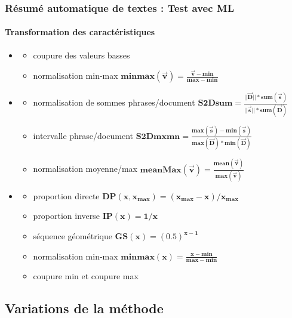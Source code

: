 \documentclass[xcolor=table]{beamer}
\begin{document}
\begin{frame}
\frametitle{Résumé automatique de textes : Test avec ML}
\framesubtitle{Transformation des caractéristiques}

\begin{itemize}
	\item {}
	\begin{itemize}
		\item coupure des valeurs basses
		\item normalisation min-max 
		{\color{red}
		$\mathbf{minmax(\overrightarrow{v}) = \frac{\overrightarrow{v} - min}{max - min}}$
		}
	\end{itemize}

	\item {}
	\begin{itemize}
		\item normalisation de sommes phrases/document 
		{\color{red}
		$\mathbf{S2Dsum = \frac{||\overrightarrow{D}|| * sum(\overrightarrow{s})}{||\overrightarrow{s}|| * sum(\overrightarrow{D})}}$
		}
		\item intervalle phrase/document 
		{\color{red}
		$\mathbf{S2Dmxmn = \frac{max(\overrightarrow{s}) - min(\overrightarrow{s})}{max(\overrightarrow{D}) * min(\overrightarrow{D})}}$
		}
		\item normalisation moyenne/max 
		{\color{red}
		$\mathbf{meanMax(\overrightarrow{v}) = \frac{mean(\overrightarrow{v})}{max(\overrightarrow{v})}}$
		}
	\end{itemize}

	\item {}
	\begin{itemize}
		\item proportion directe 
		{\color{red}
		$\mathbf{DP(x, x_{max}) = (x_{max} - x)/x_{max}}$
		}
		\item proportion inverse {\color{red}$\mathbf{IP(x) = 1/x}$}
		\item séquence géométrique {\color{red}$\mathbf{GS(x) = (0.5)^{x - 1}}$}
		\item normalisation min-max {\color{red}$\mathbf{minmax(x) = \frac{x - min}{max - min}}$}
		\item coupure min et coupure max
	\end{itemize}
\end{itemize}
	
\end{frame}

\subsection{Variations de la méthode}
\end{document}
